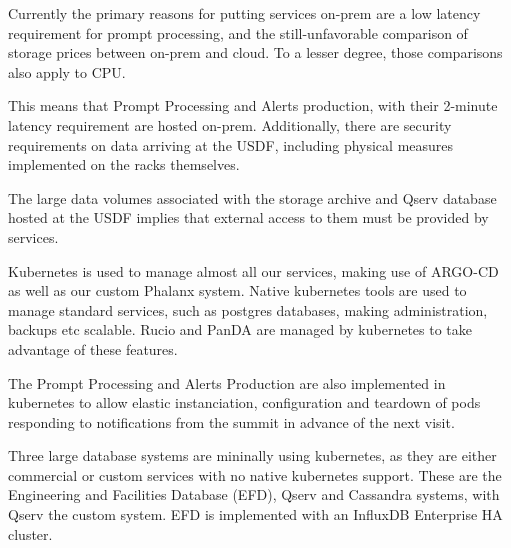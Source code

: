 Currently the primary reasons for putting services on-prem are a low
latency requirement for prompt processing, and the still-unfavorable
comparison of storage prices between on-prem and cloud. To a lesser
degree, those comparisons also apply to CPU.

This means that Prompt Processing and Alerts production, with their
2-minute latency requirement are hosted on-prem. Additionally, there
are security requirements on data arriving at the USDF, including
physical measures implemented on the racks themselves.

The large data volumes associated with the storage archive and Qserv
database hosted at the USDF implies that external access to them must be
provided by services.

Kubernetes is used to manage almost all our services, making use of
ARGO-CD as well as our custom Phalanx system. Native kubernetes tools
are used to manage standard services, such as postgres databases,
making administration, backups etc scalable. Rucio and PanDA are
managed by kubernetes to take advantage of these features.

The Prompt Processing and Alerts Production are also implemented in
kubernetes to allow elastic instanciation, configuration and teardown of
pods responding to notifications from the summit in advance of the
next visit.

Three large database systems are mininally using kubernetes, as they
are either commercial or custom services with no native kubernetes
support. These are the Engineering and Facilities Database (EFD),
Qserv and Cassandra systems, with Qserv the custom system. EFD is
implemented with an InfluxDB Enterprise HA cluster.